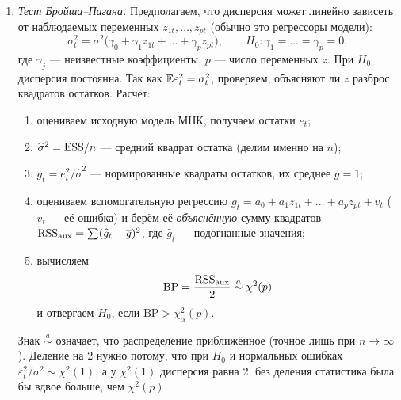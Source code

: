 \begin{enumerate}[label=\arabic*), leftmargin=2.2em, itemsep=4pt]
  \item \emph{Тест Бройша--Пагана.} Предполагаем, что дисперсия может
        линейно зависеть от наблюдаемых переменных $z_{1t}, \dots, z_{pt}$
        (обычно это регрессоры модели):
        \[
          \sigma_t^2 = \sigma^2\bigl(\gamma_0 + \gamma_1z_{1t} + \dots + \gamma_pz_{pt}\bigr),
          \qquad
          H_0\colon \gamma_1 = \dots = \gamma_p = 0,
        \]
        где $\gamma_j$ — неизвестные коэффициенты, $p$ — число переменных $z$.
        При $H_0$ дисперсия постоянна. Так как $\mathbb{E}\varepsilon_t^2 = \sigma_t^2$,
        проверяем, объясняют ли $z$ разброс квадратов остатков. Расчёт:
        \begin{enumerate}[label=\asbuk*), leftmargin=1.8em, itemsep=1pt]
          \item оцениваем исходную модель МНК, получаем остатки $e_t$;
          \item $\widehat{\sigma}^2 = \mathrm{ESS}/n$ — средний квадрат остатка
                (делим именно на $n$);
          \item $g_t = e_t^2/\widehat{\sigma}^2$ — нормированные квадраты
                остатков, их среднее $\overline{g} = 1$;
          \item оцениваем вспомогательную регрессию
                $g_t = a_0 + a_1z_{1t} + \dots + a_pz_{pt} + v_t$ ($v_t$ — её
                ошибка) и берём её \emph{объяснённую} сумму квадратов
                $\mathrm{RSS}_{\text{aux}} = \sum(\widehat g_t - \overline{g})^2$, где
                $\widehat g_t$ — подогнанные значения;
          \item вычисляем
                \begin{equation}
                  \mathrm{BP} = \frac{\mathrm{RSS}_{\text{aux}}}{2} \overset{a}{\sim} \chi^2(p)
                  \label{eq:bp}
                \end{equation}
                и отвергаем $H_0$, если $\mathrm{BP} > \chi^2_\alpha(p)$.
        \end{enumerate}
        Знак $\overset{a}{\sim}$ означает, что распределение приближённое
        (точное лишь при $n \to \infty$). Деление на 2 нужно потому, что при
        $H_0$ и нормальных ошибках $\varepsilon_t^2/\sigma^2 \sim \chi^2(1)$,
        а у $\chi^2(1)$ дисперсия равна 2: без деления статистика была бы
        вдвое больше, чем $\chi^2(p)$.


\end{enumerate}
